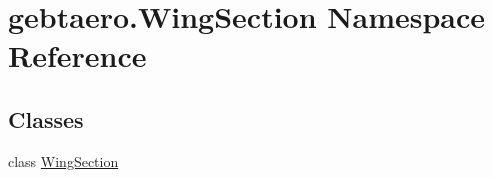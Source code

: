 \hypertarget{namespacegebtaero_1_1_wing_section}{}\section{gebtaero.\+Wing\+Section Namespace Reference}
\label{namespacegebtaero_1_1_wing_section}
\subsection*{Classes}
\begin{DoxyCompactItemize}
\item 
class \hyperlink{classgebtaero_1_1_wing_section_1_1_wing_section}{Wing\+Section}
\end{DoxyCompactItemize}
